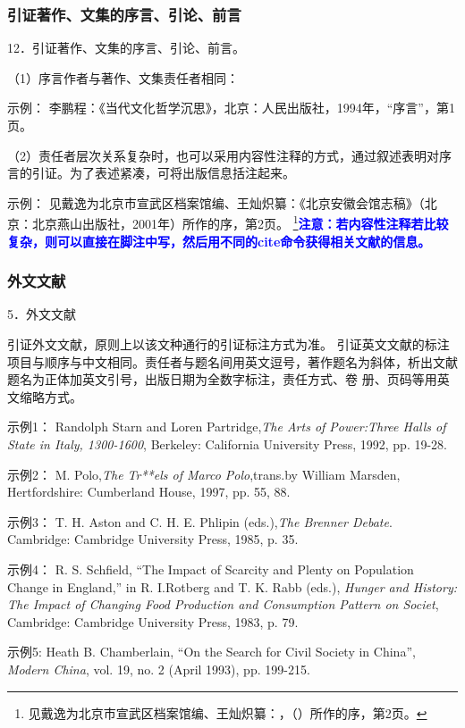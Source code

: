 \documentclass{article}
\newcommand{\qd}[1]{\textbf{\textcolor{blue}{#1}}}
\begin{document}
\subsubsection{引证著作、文集的序言、引论、前言}
12．引证著作、文集的序言、引论、前言。

（1）序言作者与著作、文集责任者相同：

示例：
李鹏程：《当代文化哲学沉思》，北京：人民出版社，1994年，“序言”，第1页。


（2）责任者层次关系复杂时，也可以采用内容性注释的方式，通过叙述表明对序言的引证。为了表述紧凑，可将出版信息括注起来。

示例：
见戴逸为北京市宣武区档案馆编、王灿炽纂：《北京安徽会馆志稿》（北京：北京燕山出版社，2001年）所作的序，第2页。
\footnote{见戴逸为北京市宣武区档案馆编、王灿炽纂：，（）所作的序，第2页。}\qd{注意：若内容性注释若比较复杂，则可以直接在脚注中写，然后用不同的cite命令获得相关文献的信息。}

\subsubsection{外文文献}
5．外文文献

引证外文文献，原则上以该文种通行的引证标注方式为准。
引证英文文献的标注项目与顺序与中文相同。责任者与题名间用英文逗号，著作题名为斜体，析出文献题名为正体加英文引号，出版日期为全数字标注，责任方式、卷
册、页码等用英文缩略方式。

示例1：
Randolph Starn and Loren Partridge,\textit{The Arts of Power:Three Halls of State in Italy, 1300-1600}, Berkeley: California University Press, 1992, pp. 19-28.

示例2：
M. Polo,\textit{The Tr**els of Marco Polo},trans.by William Marsden, Hertfordshire: Cumberland House, 1997, pp. 55, 88.

示例3：
T. H. Aston and C. H. E. Phlipin (eds.),\textit{The Brenner Debate}. Cambridge: Cambridge University Press, 1985, p. 35.

示例4：
R. S. Schfield, “The Impact of Scarcity and Plenty on Population Change in England,” in R. I.Rotberg and T. K. Rabb (eds.), \textit{Hunger and History: The Impact of Changing Food
Production and Consumption Pattern on Societ}, Cambridge: Cambridge University Press, 1983, p. 79.

示例5:
Heath B. Chamberlain, “On the Search for Civil Society in China”, \textit{Modern China}, vol. 19, no. 2 (April 1993), pp. 199-215.
\end{document}
